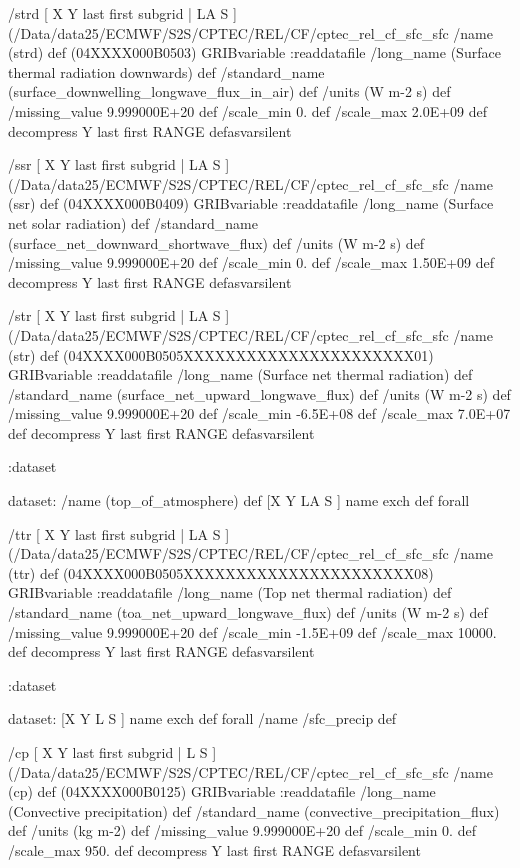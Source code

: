 \begin{ingrid}
{/strd { [ X Y last first subgrid | LA S ] (/Data/data25/ECMWF/S2S/CPTEC/REL/CF/cptec_rel_cf_sfc_sfc%
  /name (strd) def
  (04XXXX000B0503) GRIBvariable
  :readdatafile
  /long_name (Surface thermal radiation downwards) def
  /standard_name (surface_downwelling_longwave_flux_in_air) def
  /units (W m-2 s) def
  /missing_value 9.999000E+20 def
  /scale_min 0. def
  /scale_max 2.0E+09 def
  decompress
  Y last first RANGE
} defasvarsilent

/ssr { [ X Y last first subgrid | LA S ] (/Data/data25/ECMWF/S2S/CPTEC/REL/CF/cptec_rel_cf_sfc_sfc%
  /name (ssr) def
  (04XXXX000B0409) GRIBvariable
  :readdatafile
  /long_name (Surface net solar radiation) def
  /standard_name (surface_net_downward_shortwave_flux) def
  /units (W m-2 s) def
  /missing_value 9.999000E+20 def
  /scale_min 0. def
  /scale_max 1.50E+09 def
  decompress
  Y last first RANGE
} defasvarsilent

/str { [ X Y last first subgrid | LA S ] (/Data/data25/ECMWF/S2S/CPTEC/REL/CF/cptec_rel_cf_sfc_sfc%
  /name (str) def
  (04XXXX000B0505XXXXXXXXXXXXXXXXXXXXXX01) GRIBvariable
  :readdatafile
  /long_name (Surface net thermal radiation) def
  /standard_name (surface_net_upward_longwave_flux) def
  /units (W m-2 s) def
  /missing_value 9.999000E+20 def
  /scale_min -6.5E+08 def
  /scale_max 7.0E+07 def
  decompress
  Y last first RANGE
} defasvarsilent

:dataset

dataset:
/name (top_of_atmosphere) def
[X Y LA S ] {name exch def } forall

/ttr { [ X Y last first subgrid | LA S ] (/Data/data25/ECMWF/S2S/CPTEC/REL/CF/cptec_rel_cf_sfc_sfc%
  /name (ttr) def
  (04XXXX000B0505XXXXXXXXXXXXXXXXXXXXXX08) GRIBvariable
  :readdatafile
  /long_name (Top net thermal radiation) def
  /standard_name (toa_net_upward_longwave_flux) def
  /units (W m-2 s) def
  /missing_value 9.999000E+20 def
  /scale_min -1.5E+09 def
  /scale_max 10000. def
  decompress
  Y last first RANGE
} defasvarsilent

:dataset

dataset:
[X Y L S ] {name exch def } forall
/name /sfc_precip def

/cp { [ X Y last first subgrid | L S ] (/Data/data25/ECMWF/S2S/CPTEC/REL/CF/cptec_rel_cf_sfc_sfc%
  /name (cp) def
  (04XXXX000B0125) GRIBvariable
  :readdatafile
  /long_name (Convective precipitation) def
  /standard_name (convective_precipitation_flux) def
  /units (kg m-2) def
  /missing_value 9.999000E+20 def
  /scale_min 0. def
  /scale_max 950. def
  decompress
  Y last first RANGE
} defasvarsilent

}
\end{ingrid}
